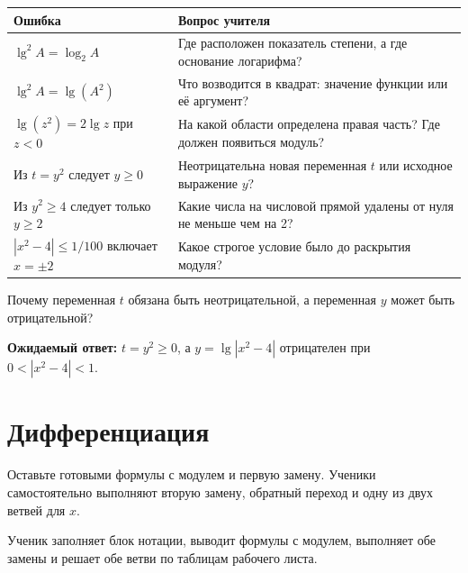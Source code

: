 \begin{center}
  \renewcommand{\arraystretch}{1.45}
  \begin{tabularx}{\textwidth}{@{}
    >{\raggedright\arraybackslash}p{}
    >{\raggedright\arraybackslash}X@{}}
    \toprule
    \rowcolor{TableHeader}
    Ошибка & Вопрос учителя \\
    \midrule
    \(\lg^2 A=\log_2 A\) & Где расположен показатель степени, а где основание логарифма? \\
    \(\lg^2 A=\lg(A^2)\) & Что возводится в квадрат: значение функции или её аргумент? \\
    \(\lg(z^2)=2\lg z\) при \(z<0\) & На какой области определена правая часть? Где должен появиться модуль? \\
    Из \(t=y^2\) следует \(y\ge0\) & Неотрицательна новая переменная \(t\) или исходное выражение \(y\)? \\
    Из \(y^2\ge4\) следует только \(y\ge2\) & Какие числа на числовой прямой удалены от нуля не меньше чем на 2? \\
    \(|x^2-4|\le1/100\) включает \(x=\pm2\) & Какое строгое условие было до раскрытия модуля? \\
    \bottomrule
  \end{tabularx}
\end{center}

\begin{teacherbox}
  Почему переменная \(t\) обязана быть неотрицательной, а переменная \(y\)
  может быть отрицательной?

  \textbf{Ожидаемый ответ:} \(t=y^2\ge0\), а
  \(y=\lg|x^2-4|\) отрицателен при \(0<|x^2-4|<1\).
\end{teacherbox}

\section{Дифференциация}

\begin{teacherbox}
  Оставьте готовыми формулы с модулем и первую замену. Ученики самостоятельно
  выполняют вторую замену, обратный переход и одну из двух ветвей для \(x\).
\end{teacherbox}

\begin{teacherbox}
  Ученик заполняет блок нотации, выводит формулы с модулем, выполняет обе
  замены и решает обе ветви по таблицам рабочего листа.
\end{teacherbox}

